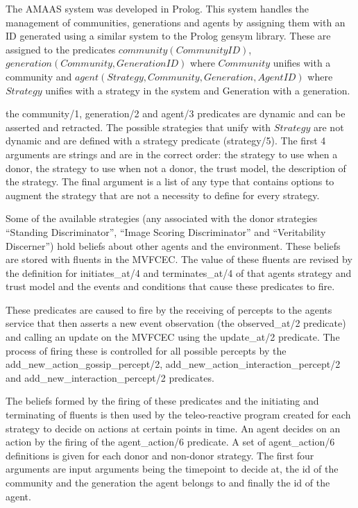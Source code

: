\documentclass[]{final_report}
\begin{document}
The AMAAS system was developed in Prolog. This system handles the management of communities, generations and agents by assigning them with an ID generated using a similar system to the Prolog gensym library. These are assigned to the predicates $community(CommunityID)$, $generation(Community, GenerationID)$ where $Community$ unifies with a community and $agent(Strategy, Community, Generation, AgentID)$ where $Strategy$ unifies with a strategy in the system and Generation with a generation.\par
the community/1, generation/2 and agent/3 predicates are dynamic and can be asserted and retracted. The possible strategies that unify with $Strategy$ are not dynamic and are defined with a strategy predicate (strategy/5). The first 4 arguments are strings and are in the correct order: the strategy to use when a donor, the strategy to use when not a donor, the trust model, the description of the strategy. The final argument is a list of any type that contains options to augment the strategy that are not a necessity to define for every strategy.\par 
Some of the available strategies (any associated with the donor strategies ``Standing Discriminator'', ``Image Scoring Discriminator'' and ``Veritability Discerner'') hold beliefs about other agents and the environment. These beliefs are stored with fluents in the MVFCEC. The value of these fluents are revised by the definition for initiates\_at/4 and terminates\_at/4 of that agents strategy and trust model and the events and conditions that cause these predicates to fire.\par
These predicates are caused to fire by the receiving of percepts to the agents service that then asserts a new event observation (the observed\_at/2 predicate) and calling an update on the MVFCEC using the update\_at/2 predicate. The process of firing these is controlled for all possible percepts by the add\_new\_action\_gossip\_percept/2, add\_new\_action\_interaction\_percept/2 and add\_new\_interaction\_percept/2 predicates.\par
The beliefs formed by the firing of these predicates and the initiating and terminating of fluents is then used by the teleo-reactive program created for each strategy to decide on actions at certain points in time. An agent decides on an action by the firing of the agent\_action/6 predicate. A set of agent\_action/6 definitions is given for each donor and non-donor strategy. The first four arguments are input arguments being the timepoint to decide at, the id of the community and the generation the agent belongs to and finally the id of the agent.\par 
\end{document}
